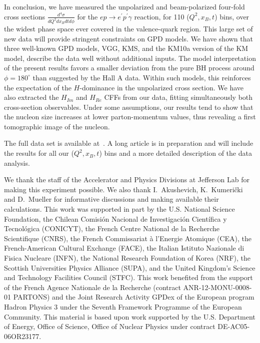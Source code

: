 \documentclass[nofootinbib,twocolumn,showpacs,prl,superscriptaddress,secnumarabic,amssymb,nobibnotes,aps,floatfix]{revtex4-1}
\begin{document}
In conclusion, we have measured the unpolarized and beam-polarized four-fold cross sections
$\frac{d^4 \sigma}{dQ^2 dx_B dt d\phi}$
for the $ep\to e^\prime p^\prime \gamma$ reaction, for 110 ($Q^2,x_B,t$) bins, over the
widest phase space ever covered in the valence-quark region. This large set of new data
will provide stringent constraints on GPD models. We have shown that three
well-known GPD models, VGG, KMS, and the KM10a version of the KM model, describe
the data well without additional inputs.
The model interpretation of the present results favors a smaller deviation from the pure
BH process around $\phi=180^{\circ}$ than suggested by the Hall A data.
Within such models, this reinforces the expectation of the $H$-dominance in the
unpolarized cross section.
We have also extracted the $H_{Im}$ and $H_{Re}$ CFFs from our data, fitting simultaneously
both cross-section observables. Under some assumptions, our results tend to show that the
nucleon size increases at lower parton-momentum values, thus revealing a
first tomographic image of the nucleon.

The full data set is available at~\cite{CLASdata}.
A long article is in preparation and will include the results for all our
($Q^2,x_B,t$) bins and a more detailed description of the data analysis.

We thank the staff of the Accelerator and Physics Divisions
at Jefferson Lab for making this experiment possible.
We also thank I.~Akushevich, K.~Kumeri\v{c}ki and D.~Mueller
for informative discussions and making available their calculations.
This work was supported in part by
the U.S. National Science Foundation,
the Chilean Comisi\'on Nacional de Investigaci\'on Cient\'ifica y Tecnol\'ogica (CONICYT),
the French Centre National de la Recherche Scientifique (CNRS),
the French Commissariat \`{a} l'Energie Atomique (CEA),
the French-American Cultural Exchange (FACE),
the Italian Istituto Nazionale di Fisica Nucleare (INFN),
the National Research Foundation of Korea (NRF),
the Scottish Universities Physics Alliance (SUPA),
and the United Kingdom's Science and Technology Facilities Council (STFC).
This work benefited from the support of the French Agence Nationale de la Recherche
(contract ANR-12-MONU-0008-01 PARTONS) and the Joint Research Activity GPDex of
the European program Hadron Physics 3 under the Seventh Framework Programme of the European
Community. This material is based upon work supported by the U.S. Department of Energy,
Office of Science, Office of Nuclear Physics under contract DE-AC05-06OR23177.
\end{document}
